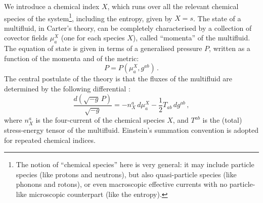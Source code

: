 \documentclass[a4paper, amsfonts, amssymb, amsmath, reprint, showkeys, nofootinbib, twoside, onecolumn,notitlepage]{revtex4-1}
\theoremstyle{definition}
\theoremstyle{theorem}
\begin{document}
We introduce a chemical index $X$, which runs over all the relevant chemical species of the system\footnote{The notion of ``chemical species'' here is very general: it may include particle species (like protons and neutrons), but also quasi-particle species (like phonons and rotons), or even macroscopic effective currents with no particle-like microscopic counterpart (like the entropy).}, including the entropy, given by $X=s$.
The state of a multifluid, in Carter's theory, can be completely characterised by a collection of covector fields $\mu^X_a$ (one for each species $X$), called ``momenta'' of the multifluid. The equation of state is given in terms of a generalised pressure $P$, written as a function of the momenta and of the metric:
\begin{equation}
P=P(\mu^X_a,g^{ab}) \, .
\end{equation}
The central postulate of the theory is that the fluxes of the multifluid are determined by the following differential \cite{GavassinoKhalatnikov2021}:
\begin{equation}\label{dP}
\dfrac{d (\sqrt{-g} \, P)}{\sqrt{-g}} = -n_X^a \, d\mu^X_a - \dfrac{1}{2} T_{ab} \, dg^{ab} \, ,
\end{equation}
where $n_X^a$ is the four-current of the chemical species $X$, and $T^{ab}$ is the (total) stress-energy tensor of the multifluid. Einstein's summation convention is adopted for repeated chemical indices. 
\end{document}
